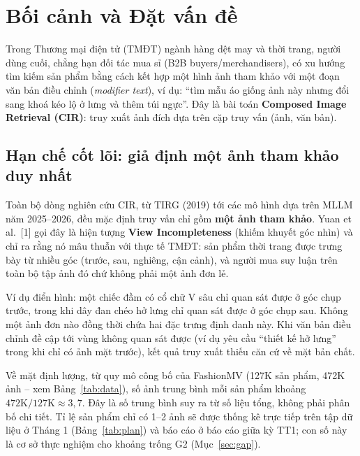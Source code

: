 \documentclass[a4paper]{article}
\renewcommand{\arraystretch}{1}
\begin{document}

\newpage
\tableofcontents
\newpage

\renewcommand{\arraystretch}{1.25}

\section{Bối cảnh và Đặt vấn đề}

Trong Thương mại điện tử (TMĐT) ngành hàng dệt may và thời trang, người dùng cuối, chẳng hạn đối tác mua sỉ (B2B buyers/merchandisers), có xu hướng tìm kiếm sản phẩm bằng cách kết hợp một hình ảnh tham khảo với một đoạn văn bản điều chỉnh (\textit{modifier text}), ví dụ: ``tìm mẫu áo giống ảnh này nhưng đổi sang khoá kéo lộ ở lưng và thêm túi ngực''. Đây là bài toán \textbf{Composed Image Retrieval (CIR)}: truy xuất ảnh đích dựa trên cặp truy vấn (ảnh, văn bản).

\subsection{Hạn chế cốt lõi: giả định một ảnh tham khảo duy nhất}

Toàn bộ dòng nghiên cứu CIR, từ TIRG (2019) tới các mô hình dựa trên MLLM năm 2025--2026, đều mặc định truy vấn chỉ gồm \textbf{một ảnh tham khảo}. Yuan et al.~[1] gọi đây là hiện tượng \textbf{View Incompleteness} (khiếm khuyết góc nhìn) và chỉ ra rằng nó mâu thuẫn với thực tế TMĐT: sản phẩm thời trang được trưng bày từ nhiều góc (trước, sau, nghiêng, cận cảnh), và người mua suy luận trên toàn bộ tập ảnh đó chứ không phải một ảnh đơn lẻ.

Ví dụ điển hình: một chiếc đầm có cổ chữ V sâu chỉ quan sát được ở góc chụp trước, trong khi dây đan chéo hở lưng chỉ quan sát được ở góc chụp sau. Không một ảnh đơn nào đồng thời chứa hai đặc trưng định danh này. Khi văn bản điều chỉnh đề cập tới vùng không quan sát được (ví dụ yêu cầu ``thiết kế hở lưng'' trong khi chỉ có ảnh mặt trước), kết quả truy xuất thiếu căn cứ về mặt bản chất.

Về mặt định lượng, từ quy mô công bố của FashionMV (127K sản phẩm, 472K ảnh -- xem Bảng~\ref{tab:data}), số ảnh trung bình mỗi sản phẩm khoảng $472\text{K}/127\text{K} \approx 3{,}7$. Đây là số trung bình suy ra từ số liệu tổng, không phải phân bố chi tiết. Tỉ lệ sản phẩm chỉ có 1--2 ảnh sẽ được thống kê trực tiếp trên tập dữ liệu ở Tháng 1 (Bảng~\ref{tab:plan}) và báo cáo ở báo cáo giữa kỳ TT1; con số này là cơ sở thực nghiệm cho khoảng trống G2 (Mục~\ref{sec:gap}).
\end{document}
